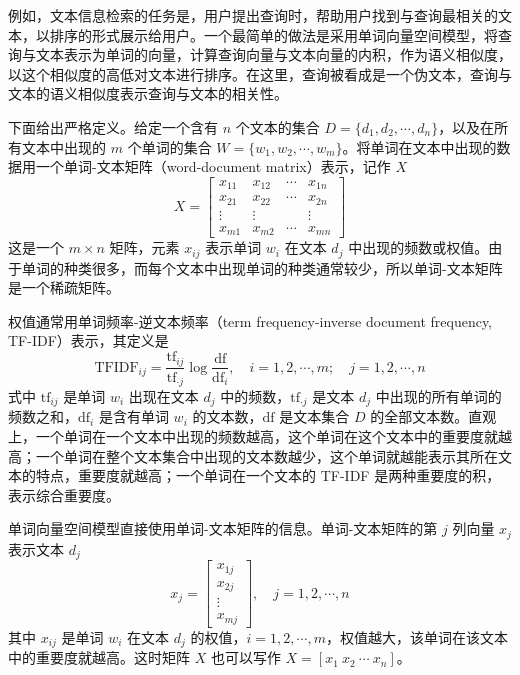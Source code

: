 \documentclass[UTF8,12pt,a4paper,fontset=fandol]{ctexart}
\begin{document}
例如，文本信息检索的任务是，用户提出查询时，帮助用户找到与查询最相关的文本，以排序的形式展示给用户。一个最简单的做法是采用单词向量空间模型，将查询与文本表示为单词的向量，计算查询向量与文本向量的内积，作为语义相似度，以这个相似度的高低对文本进行排序。在这里，查询被看成是一个伪文本，查询与文本的语义相似度表示查询与文本的相关性。

下面给出严格定义。给定一个含有 $n$ 个文本的集合 $D=\{d_1,d_2,\cdots,d_n\}$，以及在所有文本中出现的 $m$ 个单词的集合 $W=\{w_1,w_2,\cdots,w_m\}$。将单词在文本中出现的数据用一个单词-文本矩阵（word-document matrix）表示，记作 $X$
\begin{equation}
X=
\begin{bmatrix}
x_{11} & x_{12} & \cdots & x_{1n}\\
x_{21} & x_{22} & \cdots & x_{2n}\\
\vdots & \vdots & & \vdots\\
x_{m1} & x_{m2} & \cdots & x_{mn}
\end{bmatrix}
\tag{17.1}
\end{equation}
这是一个 $m\times n$ 矩阵，元素 $x_{ij}$ 表示单词 $w_i$ 在文本 $d_j$ 中出现的频数或权值。由于单词的种类很多，而每个文本中出现单词的种类通常较少，所以单词-文本矩阵是一个稀疏矩阵。

权值通常用单词频率-逆文本频率（term frequency-inverse document frequency, TF-IDF）表示，其定义是
\begin{equation}
\mathrm{TFIDF}_{ij}=\frac{\mathrm{tf}_{ij}}{\mathrm{tf}_{\cdot j}}\log\frac{\mathrm{df}}{\mathrm{df}_i},\quad
i=1,2,\cdots,m;\quad j=1,2,\cdots,n
\tag{17.2}
\end{equation}
式中 $\mathrm{tf}_{ij}$ 是单词 $w_i$ 出现在文本 $d_j$ 中的频数，$\mathrm{tf}_{\cdot j}$ 是文本 $d_j$ 中出现的所有单词的频数之和，$\mathrm{df}_i$ 是含有单词 $w_i$ 的文本数，$\mathrm{df}$ 是文本集合 $D$ 的全部文本数。直观上，一个单词在一个文本中出现的频数越高，这个单词在这个文本中的重要度就越高；一个单词在整个文本集合中出现的文本数越少，这个单词就越能表示其所在文本的特点，重要度就越高；一个单词在一个文本的 TF-IDF 是两种重要度的积，表示综合重要度。

单词向量空间模型直接使用单词-文本矩阵的信息。单词-文本矩阵的第 $j$ 列向量 $x_j$ 表示文本 $d_j$
\begin{equation}
x_j=
\begin{bmatrix}
x_{1j}\\
x_{2j}\\
\vdots\\
x_{mj}
\end{bmatrix},
\quad j=1,2,\cdots,n
\tag{17.3}
\end{equation}
其中 $x_{ij}$ 是单词 $w_i$ 在文本 $d_j$ 的权值，$i=1,2,\cdots,m$，权值越大，该单词在该文本中的重要度就越高。这时矩阵 $X$ 也可以写作 $X=[x_1\ x_2\ \cdots\ x_n]$。
\end{document}
